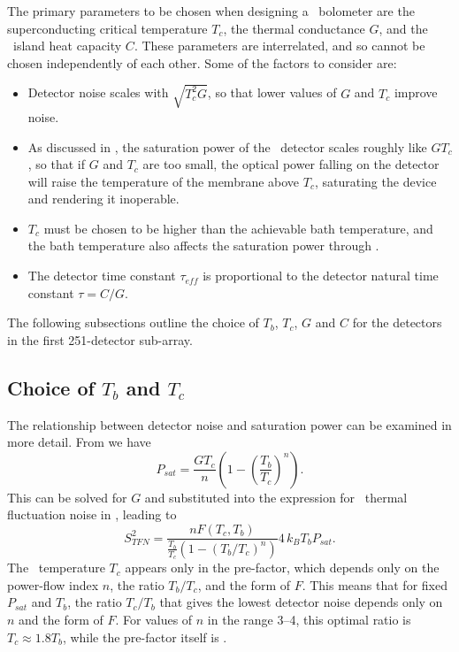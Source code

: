 The primary parameters to be chosen when designing a \TES\ bolometer are the superconducting critical temperature $T_c$, the thermal conductance $G$, and the \TES\ island heat capacity $C$.
These parameters are interrelated, and so cannot be chosen independently of each other.
Some of the factors to consider are:
\begin{itemize}
  \item Detector noise scales with $\sqrt{T_c^2 G}$, so that lower values of $G$ and $T_c$ improve noise.
  \item As discussed in , the saturation power of the \TES\ detector scales roughly like $G T_c$, so that if $G$ and $T_c$ are too small, the optical power falling on the detector will raise the temperature of the membrane above $T_c$, saturating the device and rendering it inoperable.
  \item $T_c$ must be chosen to be higher than the achievable bath temperature, and the bath temperature also affects the saturation power through .
  \item The detector time constant $\tau_{eff}$ is proportional to the detector natural time constant $\tau = C / G$.
\end{itemize}


The following subsections outline the choice of $T_b$, $T_c$, $G$ and $C$ for the detectors in the first 251-detector sub-array.

\subsection{Choice of $T_b$ and $T_c$}

The relationship between detector noise and saturation power can be examined in more detail.
From  we have
\begin{equation} \label{eqn:ch5-psat}
P_{sat} = \frac{G T_c}{n}\left(1 - \left(\frac{T_b}{T_c}\right)^n\right).
\end{equation}
This can be solved for $G$ and substituted into the expression for \TES\ thermal fluctuation noise in , leading to
\begin{equation} \label{eqn:ch5-tes-noise}
S^2_{TFN} = \frac{n F(T_c, T_b) }{\frac{T_b}{T_c} \left( 1-(T_b/T_c)^n \right)} 4 \, k_B T_b P_{sat}.
\end{equation}
The \TES\ temperature $T_c$ appears only in the pre-factor, which depends only on the power-flow index $n$, the ratio $T_b/T_c$, and the form of $F$.
This means that for fixed $P_{sat}$ and $T_b$, the ratio $T_c/T_b$ that gives the lowest detector noise depends only on $n$ and the form of $F$.
For values of $n$ in the range 3--4, this optimal ratio is $T_c \approx 1.8 T_b$, while the pre-factor itself is .

